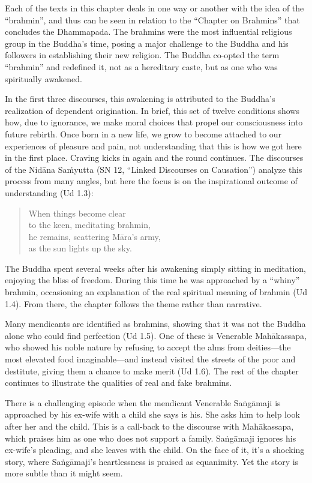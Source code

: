 \documentclass[12pt,openany]{book}%
\begin{document}
Each of the texts in this chapter deals in one way or another with the idea of the “brahmin”, and thus can be seen in relation to the “Chapter on Brahmins” that concludes the Dhammapada. The brahmins were the most influential religious group in the Buddha’s time, posing a major challenge to the Buddha and his followers in establishing their new religion. The Buddha co-opted the term “brahmin” and redefined it, not as a hereditary caste, but as one who was spiritually awakened. 

In the first three discourses, this awakening is attributed to the Buddha’s realization of dependent origination. In brief, this set of twelve conditions shows how, due to ignorance, we make moral choices that propel our consciousness into future rebirth. Once born in a new life, we grow to become attached to our experiences of pleasure and pain, not understanding that this is how we got here in the first place. Craving kicks in again and the round continues. The discourses of the \textsanskrit{Nidāna} \textsanskrit{Saṁyutta} (SN 12, “Linked Discourses on Causation”) analyze this process from many angles, but here the focus is on the inspirational outcome of understanding (Ud 1.3):

\begin{quotation}%
When things become clear\\
to the keen, meditating brahmin,\\
he remains, scattering \textsanskrit{Māra}’s army,\\
as the sun lights up the sky.

%
\end{quotation}

The Buddha spent several weeks after his awakening simply sitting in meditation, enjoying the bliss of freedom. During this time he was approached by a “whiny” brahmin, occasioning an explanation of the real spiritual meaning of brahmin (Ud 1.4). From there, the chapter follows the theme rather than narrative.

Many mendicants are identified as brahmins, showing that it was not the Buddha alone who could find perfection (Ud 1.5). One of these is Venerable \textsanskrit{Mahākassapa}, who showed his noble nature by refusing to accept the alms from deities—the most elevated food imaginable—and instead visited the streets of the poor and destitute, giving them a chance to make merit (Ud 1.6). The rest of the chapter continues to illustrate the qualities of real and fake brahmins. 

There is a challenging episode when the mendicant Venerable \textsanskrit{Saṅgāmaji} is approached by his ex-wife with a child she says is his. She asks him to help look after her and the child. This is a call-back to the discourse with \textsanskrit{Mahākassapa}, which praises him as one who does not support a family. \textsanskrit{Saṅgāmaji} ignores his ex-wife’s pleading, and she leaves with the child. On the face of it, it’s a shocking story, where \textsanskrit{Saṅgāmaji}’s heartlessness is praised as equanimity. Yet the story is more subtle than it might seem. 
\end{document}
